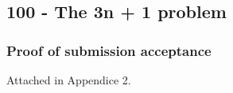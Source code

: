\subsection{100 - The 3n + 1 problem}



\subsubsection{Proof of submission acceptance}

Attached in Appendice 2.
